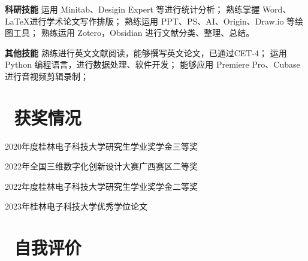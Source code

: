 \documentclass[a4paper,11pt]{ctexart}
\begin{document}
  \vspace{-1mm}

  \item \enspace\textbf{科研技能}\vspace{-2.4mm}
  \resumeItemListStart
    {运用 Minitab、Desigin Expert 等进行统计分析；}
    {熟练掌握 Word、\LaTeX 进行学术论文写作排版；}
    {熟练运用 PPT、PS、AI、Origin、Draw.io 等绘图工具；}
    {熟练运用 Zotero，Obsidian 进行文献分类、整理、总结。}
  \resumeItemListEnd

  \vspace{-1mm}

  \item \enspace\textbf{其他技能}\vspace{-2.4mm}
  \resumeItemListStart
    {熟练进行英文文献阅读，能够撰写英文论文，已通过CET-4；}
    {运用 Python 编程语言，进行数据处理、软件开发；}
    {能够应用 Premiere Pro、Cubase 进行音视频剪辑录制；}
  \resumeItemListEnd
  
\resumeSubHeadingListEnd

\vspace{-8mm}

\section{\texorpdfstring{\faTrophy\,}{} 获奖情况}

\resumeItemListStart
  \item 2020年度桂林电子科技大学研究生学业奖学金三等奖
  \item 2022年全国三维数字化创新设计大赛广西赛区二等奖
  \item 2022年度桂林电子科技大学研究生学业奖学金二等奖
  \item 2023年桂林电子科技大学优秀学位论文
\resumeItemListEnd
\vspace{-4mm}

\section{\texorpdfstring{\faUserEdit\,}{} 自我评价}
\end{document}
